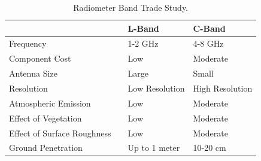 \documentclass[12pt]{article}
\begin{document}
\begin{table}[!h]
	\centering
	\vspace{0.5cm}
	\renewcommand{\arraystretch}{1.3}
	\caption{Radiometer Band Trade Study. }
	\label{tab:band_trade}
	\begin{tabularx}{\textwidth}{lXll}
		\toprule
									& & L-Band & C-Band \\		
		\midrule
		Frequency					& &1-2 GHz&4-8 GHz \\ 
		Component Cost				& &Low&Moderate	 \\
		Antenna Size 				& &Large&Small	 \\
		Resolution 					& &Low Resolution&High Resolution 	\\ 
		Atmospheric Emission		& &Low&Moderate 					\\ 
		Effect of Vegetation		& &Low&Moderate						\\
		Effect of Surface Roughness	& &Low&Moderate						\\
		Ground Penetration			& &Up to 1 meter&10-20 cm			\\
	\end{tabularx}
\end{table}
\end{document}
